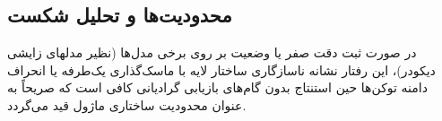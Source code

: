 \subsection{محدودیت‌ها و تحلیل شکست}
در صورت ثبت دقت صفر یا وضعیت  بر روی برخی مدل‌ها (نظیر مدلهای زایشی دیکودر)، این رفتار نشانه ناسازگاری ساختار لایه با ماسک‌گذاری یک‌طرفه یا انحراف دامنه توکن‌ها حین استنتاج بدون گام‌های بازیابی گرادیانی کافی است که صریحاً به عنوان محدودیت ساختاری ماژول قید می‌گردد.
